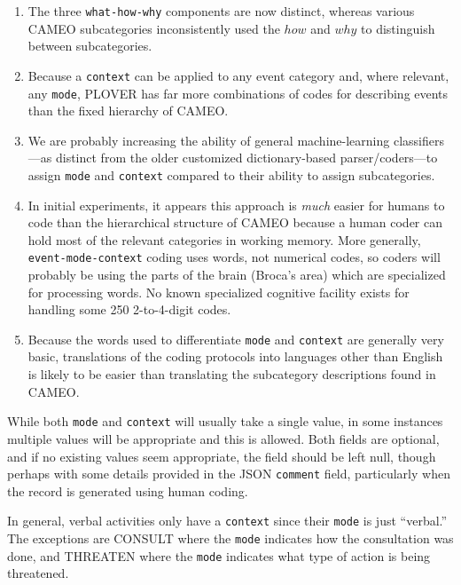 \documentclass[11pt]{report}
\newcommand{\plcat}[1]{\textsf{#1}}
\newcommand{\txt}[1]{\texttt{#1}}
\begin{document}
\begin{enumerate}

\item The three \texttt{what-how-why} components are now distinct, whereas various CAMEO subcategories inconsistently used the $how$ and $why$ to distinguish between subcategories.

\item Because a \txt{context} can be applied to any event category and, where relevant, any \txt{mode}, PLOVER has far more combinations of codes for describing events than the fixed hierarchy of CAMEO.

\item We are probably increasing the ability of general machine-learning classifiers---as distinct from the older customized dictionary-based parser/coders---to assign \txt{mode} and \txt{context} compared to their ability to assign subcategories.

\item In initial experiments, it appears this  approach is \textit{much} easier for humans to code than the hierarchical structure of CAMEO because a human coder can hold most of the relevant categories in working memory. More generally,  \txt{event-mode-context}  coding uses words, not numerical codes, so coders will probably be using the parts of the brain (Broca's area) which are specialized for processing words. No known specialized cognitive facility exists for handling some 250 2-to-4-digit codes.

\item Because the words used to differentiate \txt{mode} and \txt{context} are generally very basic, translations of the coding protocols into languages other than English is likely to be easier than translating the subcategory descriptions found in CAMEO. 
\end{enumerate}

While both \txt{mode} and \txt{context} will usually take a single value, in some instances multiple values will be appropriate and this is allowed. Both fields are optional, and if no existing values seem appropriate, the field should be left null, though perhaps with some details provided in the JSON \texttt{comment} field, particularly when the record is generated using human coding.

In general, verbal activities only have a \txt{context} since their \txt{mode} is just ``verbal.'' The exceptions are \plcat{CONSULT} where the \texttt{mode} indicates how the consultation was done, and \plcat{THREATEN} where the \texttt{mode} indicates what type of action is being threatened. 
\end{document}
